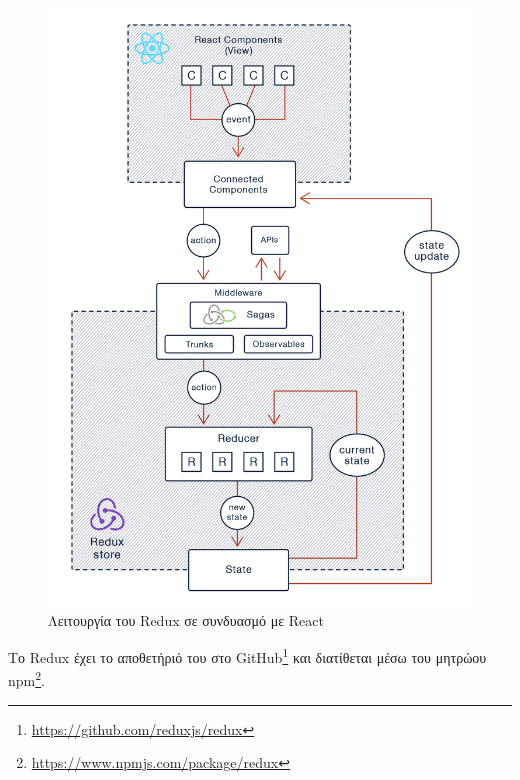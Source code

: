 \begin{figure}[H]
	\centering
	\includegraphics[width=.9\textwidth]{assets/figures/chapter-4/4.2.react-redux}
	\caption{Λειτουργία του Redux σε συνδυασμό με React}
\end{figure}
\vspace{\parskip}
Το Redux έχει το αποθετήριό του στο GitHub\footnote{\url{https://github.com/reduxjs/redux}} και διατίθεται μέσω του μητρώου npm\footnote{\url{https://www.npmjs.com/package/redux}}.
